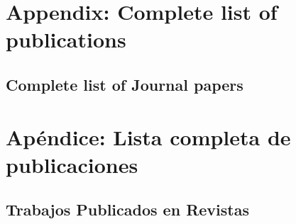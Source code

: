 \ifeng
\section*{Appendix: Complete list of publications}
\subsection*{Complete list of Journal papers}
\else
\section*{Apéndice: Lista completa de publicaciones}
\subsection*{Trabajos Publicados en Revistas}
\fi
\noindent
